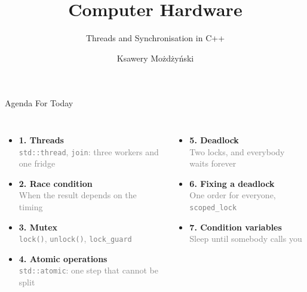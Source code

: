 \documentclass[aspectratio=169,10pt]{beamer}
\title{Computer Hardware}
\subtitle{Threads and Synchronisation in C++}
\author{Ksawery Możdżyński}
\date{}
\begin{document}
\begin{frame}
  \titlepage
\end{frame}

\begin{frame}{Agenda For Today}
  \begin{columns}[T,onlytextwidth]
      \large
      \begin{itemize}
        \item[\textcolor{DeepBlue}{\faCodeBranch}] \textbf{1. Threads} \\
        \textcolor{gray}{\small \texttt{std::thread}, \texttt{join}: three workers and one fridge}
        \vspace{0.2cm}

        \item[\textcolor{DeepBlue}{\faRandom}] \textbf{2. Race condition} \\
        \textcolor{gray}{\small When the result depends on the timing}
        \vspace{0.2cm}

        \item[\textcolor{DeepBlue}{\faLock}] \textbf{3. Mutex} \\
        \textcolor{gray}{\small \texttt{lock()}, \texttt{unlock()}, \texttt{lock\_guard}}
        \vspace{0.2cm}

        \item[\textcolor{DeepBlue}{\faAtom}] \textbf{4. Atomic operations} \\
        \textcolor{gray}{\small \texttt{std::atomic}: one step that cannot be split}
      \end{itemize}
      \large
      \begin{itemize}
        \item[\textcolor{DeepBlue}{\faStopCircle}] \textbf{5. Deadlock} \\
        \textcolor{gray}{\small Two locks, and everybody waits forever}
        \vspace{0.2cm}

        \item[\textcolor{DeepBlue}{\faWrench}] \textbf{6. Fixing a deadlock} \\
        \textcolor{gray}{\small One order for everyone, \texttt{scoped\_lock}}
        \vspace{0.2cm}

        \item[\textcolor{DeepBlue}{\faBell}] \textbf{7. Condition variables} \\
        \textcolor{gray}{\small Sleep until somebody calls you}
        \vspace{0.2cm}


\end{itemize}
\end{columns}
\end{frame}
\end{document}
